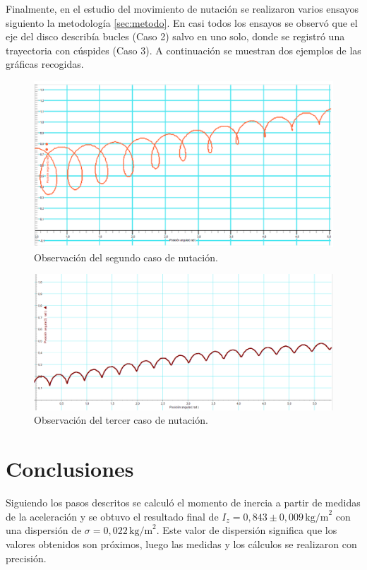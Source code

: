 \documentclass[a4paper]{article}
\begin{document}
Finalmente, en el estudio del movimiento de nutación se realizaron varios ensayos siguiento la metodología \ref{sec:metodo}. En casi todos los ensayos se observó que el eje del disco describía bucles (Caso 2) salvo en uno solo, donde se registró una trayectoria con cúspides (Caso 3). A continuación se muestran dos ejemplos de las gráficas recogidas.
\begin{figure}
\begin{center}
\includegraphics[height=8 cm]{nuta2.png}
\caption{Observación del segundo caso de nutación.}
\end{center}
\end{figure}
\begin{figure}
\begin{center}
\includegraphics[height=8 cm]{nuta3.png}
\caption{Observación del tercer caso de nutación.}
\end{center}
\end{figure}
\section{Conclusiones}
Siguiendo los pasos descritos se calculó el momento de inercia a partir de medidas de la aceleración y se obtuvo el resultado final de $I_z=0,843\pm 0,009\,\text{kg/m}^2$ con una dispersión de $\sigma=0,022\,\text{kg/m}^2$. Este valor de dispersión significa que los valores obtenidos son próximos, luego las medidas y los cálculos se realizaron con precisión.
\end{document}
